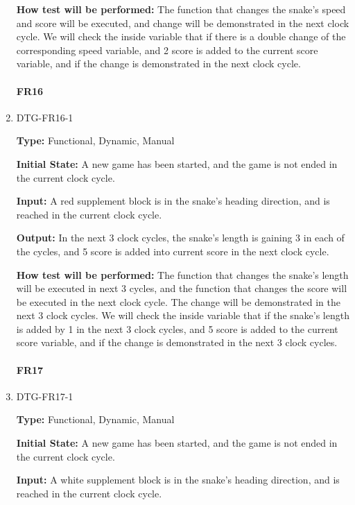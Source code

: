 \documentclass[12pt, titlepage]{article}
\begin{document}
\begin{enumerate}
\textbf{How test will be performed:} The function that changes the snake's speed and score will be executed, and change will be demonstrated in the next clock cycle. We will check the inside variable that if there is a double change of the corresponding speed variable, and 2 score is added to the current score variable, and if the change is demonstrated in the next clock cycle.

\paragraph{FR16}

\item{DTG-FR16-1\\}

\textbf{Type:} Functional, Dynamic, Manual

\textbf{Initial State:} A new game has been started, and the game is not ended in the current clock cycle.

\textbf{Input:} A red supplement block is in the snake's heading direction, and is reached in the current clock cycle.

\textbf{Output:} In the next 3 clock cycles, the snake's length is gaining 3 in each of the cycles, and 5 score is added into current score in the next clock cycle.

\textbf{How test will be performed:} The function that changes the snake's length will be executed in next 3 cycles, and the function that changes the score will be executed in the next clock cycle. The change will be demonstrated in the next 3 clock cycles. We will check the inside variable that if the snake's length is added by 1 in the next 3 clock cycles, and 5 score is added to the current score variable, and if the change is demonstrated in the next 3 clock cycles.

\paragraph{FR17}
\item{DTG-FR17-1\\}

\textbf{Type:} Functional, Dynamic, Manual

\textbf{Initial State:} A new game has been started, and the game is not ended in the current clock cycle.

\textbf{Input:} A white supplement block is in the snake's heading direction, and is reached in the current clock cycle.


\end{enumerate}
\end{document}
